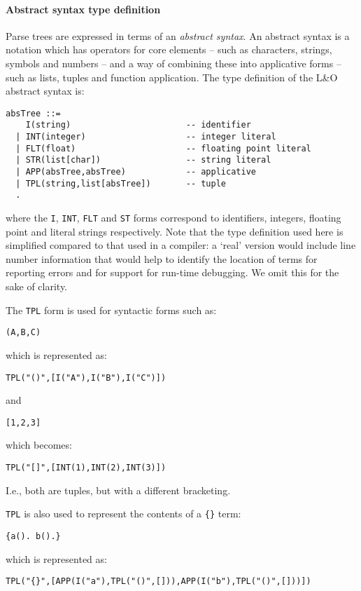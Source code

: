 \paragraph{ Abstract syntax type definition}
Parse trees are expressed in terms of an \emph{abstract syntax}. An abstract syntax is a notation which has operators for core elements -- such as characters, strings, symbols and numbers -- and a way of combining these into applicative forms -- such as lists, tuples and function application. The type definition of the L&O abstract syntax is:
\begin{verbatim}
absTree ::=
    I(string)                       -- identifier
  | INT(integer)                    -- integer literal
  | FLT(float)                      -- floating point literal
  | STR(list[char])                 -- string literal
  | APP(absTree,absTree)            -- applicative
  | TPL(string,list[absTree])       -- tuple
  .
\end{verbatim}
where the \verb+I+, \verb+INT+,  \verb+FLT+ and \verb+ST+ forms correspond to identifiers, integers, floating point and literal strings respectively. Note that the type definition used here is simplified compared to that used in a compiler: a `real' version would include line number information that would help to identify the location of terms for reporting errors and for support for run-time debugging. We omit this for the sake of clarity.

The \verb+TPL+ form is used for syntactic forms such as:
\begin{verbatim}
(A,B,C)
\end{verbatim}
which is represented as:
\begin{verbatim}
TPL("()",[I("A"),I("B"),I("C")])
\end{verbatim}
and
\begin{verbatim}
[1,2,3]
\end{verbatim}
which becomes:
\begin{verbatim}
TPL("[]",[INT(1),INT(2),INT(3)])
\end{verbatim}
I.e., both are tuples, but with a different bracketing.

\verb+TPL+ is also used to represent the contents of a \verb+{}+ term:
\begin{verbatim}
{a(). b().}
\end{verbatim}
which is represented as:
\begin{verbatim}
TPL("{}",[APP(I("a"),TPL("()",[])),APP(I("b"),TPL("()",[]))])
\end{verbatim}


